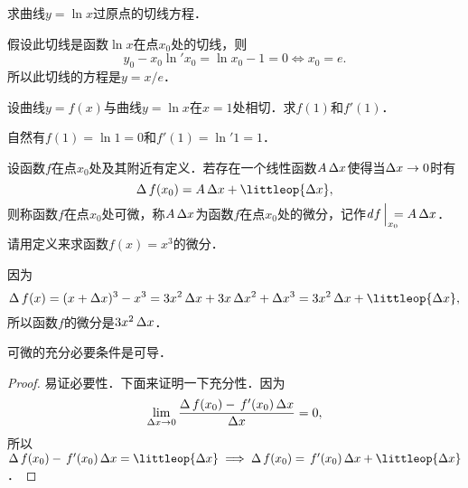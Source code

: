 \begin{example*}
  求曲线\(y = \ln x\)过原点的切线方程．

  \begin{remark}
    假设此切线是函数\(\ln x\)在点\(x_0\)处的切线，则
    \begin{equation*}
      y_0 - x_0 \ln'x_0 = \ln x_0 - 1 = 0
      \iff
      x_0 = e.
    \end{equation*}
    所以此切线的方程是\(y = x/e\)．
  \end{remark}
\end{example*}

\begin{example*}
  设曲线\(y = f(x)\)与曲线\(y = \ln x\)在\(x = 1\)处相切．求\(f(1)\)和\(f'(1)\)．

  \begin{remark}
    自然有\(f(1) = \ln 1 = 0\)和\(f'(1) = \ln' 1 = 1\)．
  \end{remark}
\end{example*}

\begin{definition*}
  \label{defn:diff}
  设函数\(f\)在点\(x_0\)处及其附近有定义．若存在一个线性函数\(A \mathop{}\!\Delta x\)使得当\(\mathop{}\!\Delta x \to 0\)时有
  \begin{equation*}
    \fwdf\,f(x_0) = A \fwdf x + \littleop{\fwdf x},
  \end{equation*}
  则称函数\(f\)在点\(x_0\)处可微，称\(A \mathop{}\!\Delta x\)为函数\(f\)在点\(x_0\)处的微分，记作\(\diff f\,\smash{\Big\vert_{\mathrlap{x_0}}\,} = A \fwdf x\)．
\end{definition*}

\begin{example*}
  请用定义来求函数\(f(x) = x^3\)的微分．

  \begin{remark}
    因为
    \begin{equation*}
      \fwdf\,f(x)
      = (x+\fwdf x)^3 - x^3
      = 3x^2 \fwdf x + 3x \fwdf x^2 + \fwdf x^3
      = 3x^2 \fwdf x + \littleop{\fwdf x},
    \end{equation*}
    所以函数\(f\)的微分是\(3x^2 \mathop{}\!\Delta x\)．
  \end{remark}
\end{example*}

\begin{theorem}
  \label{thm:diffequivderiv}
  可微的充分必要条件是可导．

  \begin{proof}
    易证必要性．下面来证明一下充分性．因为
    \begin{equation*}
      \lim_{\mathop{}\!\Delta x \to 0} \frac{\mathop{}\!\Delta\,f(x_0) - \,f'(x_0) \mathop{}\!\Delta x}{\mathop{}\!\Delta x} = 0,
    \end{equation*}
    所以\(\fwdf\,f(x_0) - \,f'(x_0) \fwdf x = \littleop{\fwdf x} \implies \fwdf\,f(x_0) = \,f'(x_0) \fwdf x + \littleop{\fwdf x}\)．
  \end{proof}
\end{theorem}

